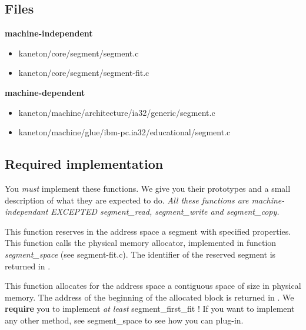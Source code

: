 \subsection*{Files}

{\color{filerefcolor} \textbf{machine-independent}}
\begin{itemize}
\item kaneton/core/segment/segment.c
\item kaneton/core/segment/segment-fit.c
\end{itemize}

{\color{filerefcolor} \textbf{machine-dependent}}
\begin{itemize}
\item kaneton/machine/architecture/ia32/generic/segment.c
\item kaneton/machine/glue/ibm-pc.ia32/educational/segment.c
\end{itemize}

\subsection*{Required implementation}
You \textit{must} implement these functions. We give you their prototypes
and a small description of what they are expected to do.
\textit{All these functions are machine-independant EXCEPTED segment\_read, segment\_write and segment\_copy.}

{
  This function reserves in the address space
   a segment with specified properties.
  \newline
  This function calls the physical memory allocator, implemented
  in function \emph{segment\_space} (see segment-fit.c).
  The identifier of the reserved segment is returned in .
}

{
  This function allocates for the address space  a
  contiguous space of size  in physical
  memory. The address of the beginning of the allocated block is
  returned in .
  \newline
  We \textbf{require} you to implement \textit{at least}
  segment\_first\_fit !
  \newline
  If you want to implement any other method, see segment\_space
  to see how you can plug-in.
}

